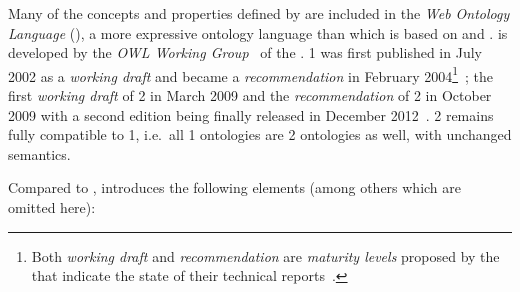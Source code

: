 \noindent{}

Many of the concepts and properties defined by  are included in the \emph{Web Ontology Language} (), a more expressive ontology language than  which is based on  and .  is developed by the \emph{OWL Working Group}~\cite{OWL-working-group} of the .  1 was first published in July 2002 as a \emph{working draft} and became a  \emph{recommendation} in February 2004\footnote{Both \emph{working draft} and \emph{recommendation} are \emph{maturity levels} proposed by the  that indicate the state of their technical reports~\cite{w3c-process}.}~\cite{OWL1}; the first \emph{working draft} of  2 in March 2009 and the  \emph{recommendation} of  2 in October 2009 with a second edition being finally released in December 2012~\cite{OWL}.
 2 remains fully compatible to  1, i.e.\ all  1 ontologies are  2 ontologies as well, with unchanged semantics.

Compared to ,  introduces the following elements (among others which are omitted here):

